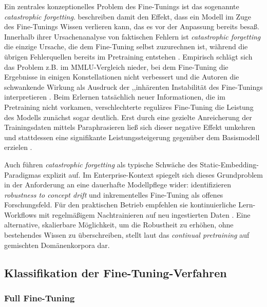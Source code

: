 Ein zentrales konzeptionelles Problem des Fine-Tunings ist das sogenannte \textit{catastrophic forgetting}. \textcite[2]{Ovadia.2024} beschreiben damit den Effekt, dass ein Modell im Zuge des Fine-Tunings Wissen verlieren kann, das es vor der Anpassung bereits besaß. Innerhalb ihrer Ursachenanalyse von faktischen Fehlern ist \textit{catastrophic forgetting} die einzige Ursache, die dem Fine-Tuning selbst zuzurechnen ist, während die übrigen Fehlerquellen bereits im Pretraining entstehen \autocite[3]{Ovadia.2024}. Empirisch schlägt sich das Problem z.B. im MMLU-Vergleich nieder, bei dem Fine-Tuning die Ergebnisse in einigen Konstellationen nicht verbessert und die Autoren die schwankende Wirkung als Ausdruck der ,,inhärenten Instabilität\grqq{} des Fine-Tunings interpretieren \autocite[7]{Ovadia.2024}. Beim Erlernen tatsächlich neuer Informationen, die im Pretraining nicht vorkamen, verschlechterte reguläres Fine-Tuning die Leistung des Modells zunächst sogar deutlich. Erst durch eine gezielte Anreicherung der Trainingsdaten mittels Paraphrasieren ließ sich dieser negative Effekt umkehren und stattdessen eine signifikante Leistungssteigerung gegenüber dem Basismodell erzielen \autocite[7f.]{Ovadia.2024}.

Auch \textcite[5]{Song.2025} führen \textit{catastrophic forgetting} als typische Schwäche des Static-Embedding-Pa\-ra\-dig\-mas explizit auf. Im Enterprise-Kontext spiegelt sich dieses Grundproblem in der Anforderung an eine dauerhafte Modellpflege wider: \textcite[17f.]{Karakurt.2026} identifizieren \textit{robustness to concept drift} und inkrementelles Fine-Tuning als offenes Forschungsfeld. Für den praktischen Betrieb empfehlen sie kontinuierliche Lern-Workflows mit regelmäßigem Nachtrainieren auf neu ingestierten Daten \autocite[20f.]{Karakurt.2026}. Eine alternative, skalierbare Möglichkeit, um die Robustheit zu erhöhen, ohne bestehendes Wissen zu überschreiben, stellt laut \textcite[14]{Song.2025} das \textit{continual pretraining} auf gemischten Domänenkorpora dar.

\subsection{Klassifikation der Fine-Tuning-Verfahren}
\label{sec:ft-klassifikation}

\subsubsection{Full Fine-Tuning}
\label{sec:ft-full}

